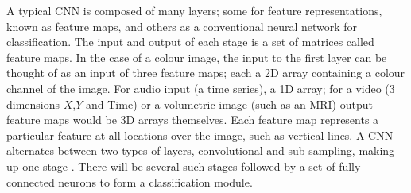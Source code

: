 \citep{mo2012survey}
A typical CNN is composed of many layers; some for feature representations, known as feature maps, and others as a conventional neural network for classification.
The input and output of each stage is a set of matrices called feature maps.
In the case of a colour image, the input to the first layer can be thought of as an input of three feature maps; each a 2D array containing a colour channel of the image.
For audio input (a time series), a 1D array; for a video (3 dimensions $X$,$Y$ and Time) or a volumetric image (such as an MRI)\citep{payan2015predicting} output feature maps would be 3D arrays themselves\citep{lecun2010convolutional}.
Each feature map represents a particular feature at all locations over the image, such as vertical lines. 
A CNN alternates between two types of layers, convolutional and sub-sampling, making up one stage\citep{chen2014big} .
There will be several such stages followed by a set of fully connected neurons to form a classification module\citep{lecun2010convolutional}.


